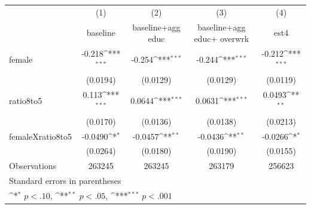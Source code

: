 {
\def\sym#1{\ifmmode^{#1}\else\(^{#1}\)\fi}
\begin{tabular}{l*{4}{c}}
\hline\hline
                    &\multicolumn{1}{c}{(1)}&\multicolumn{1}{c}{(2)}&\multicolumn{1}{c}{(3)}&\multicolumn{1}{c}{(4)}\\
                    &\multicolumn{1}{c}{baseline }&\multicolumn{1}{c}{baseline+agg educ}&\multicolumn{1}{c}{baseline+agg educ+ overwrk}&\multicolumn{1}{c}{est4}\\
\hline
female              &      -0.218\sym{***}&      -0.254\sym{***}&      -0.244\sym{***}&      -0.212\sym{***}\\
                    &    (0.0194)         &    (0.0129)         &    (0.0129)         &    (0.0119)         \\
[1em]
ratio8to5           &       0.113\sym{***}&      0.0644\sym{***}&      0.0631\sym{***}&      0.0493\sym{**} \\
                    &    (0.0170)         &    (0.0136)         &    (0.0138)         &    (0.0213)         \\
[1em]
femaleXratio8to5    &     -0.0490\sym{*}  &     -0.0457\sym{**} &     -0.0436\sym{**} &     -0.0266\sym{*}  \\
                    &    (0.0264)         &    (0.0180)         &    (0.0190)         &    (0.0155)         \\
\hline
Observations        &      263245         &      263245         &      263179         &      256623         \\
\hline\hline
\multicolumn{5}{l}{\footnotesize Standard errors in parentheses}\\
\multicolumn{5}{l}{\footnotesize \sym{*} \(p<.10\), \sym{**} \(p<.05\), \sym{***} \(p<.001\)}\\
\end{tabular}
}
